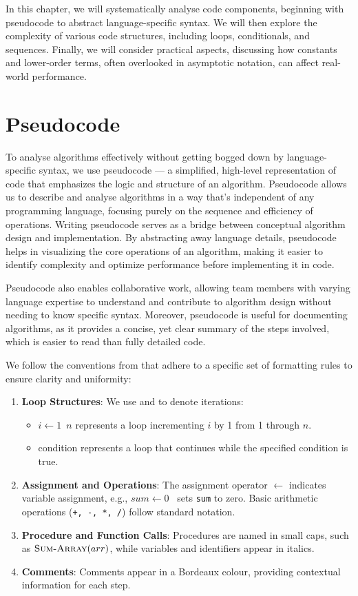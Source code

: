 In this chapter, we will systematically analyse code components, beginning with pseudocode to abstract language-specific syntax. We will then explore the complexity of various code structures, including loops, conditionals, and sequences. Finally, we will consider practical aspects, discussing how constants and lower-order terms, often overlooked in asymptotic notation, can affect real-world performance.


\section{Pseudocode}\label{sec:ch11-1}
To analyse algorithms effectively without getting bogged down by language-specific syntax, we use pseudocode — a simplified, high-level representation of code that emphasizes the logic and structure of an algorithm. Pseudocode allows us to describe and analyse algorithms in a way that’s independent of any programming language, focusing purely on the sequence and efficiency of operations. Writing pseudocode serves as a bridge between conceptual algorithm design and implementation. By abstracting away language details, pseudocode helps in visualizing the core operations of an algorithm, making it easier to identify complexity and optimize performance before implementing it in code.

Pseudocode also enables collaborative work, allowing team members with varying language expertise to understand and contribute to algorithm design without needing to know specific syntax. Moreover, pseudocode is useful for documenting algorithms, as it provides a concise, yet clear summary of the steps involved, which is easier to read than fully detailed code.

We follow the conventions from \cite{clrs4} that adhere to a specific set of formatting rules to ensure clarity and uniformity:

\begin{enumerate}
    \item \textbf{Loop Structures}: We use \texttt{\For} and \texttt{\While} to denote iterations:
    \begin{itemize}
        \item \texttt{\For $i \gets 1$ \To $n$} represents a loop incrementing \( i \) by 1 from 1 through \( n \).
        \item \texttt{\While} condition represents a loop that continues while the specified condition is true.
    \end{itemize}
    \item \textbf{Assignment and Operations}: The assignment operator $\gets$ indicates variable assignment, e.g., \texttt{$sum \gets 0$ } sets \texttt{sum} to zero. Basic arithmetic operations (\texttt{+, -, *, /}) follow standard notation.
    \item \textbf{Procedure and Function Calls}: Procedures are named in small caps, such as \texttt{$\proc{Sum-Array}(arr)$}, while variables and identifiers appear in italics.
    \item \textbf{Comments}: Comments appear in a \textcolor{commentcolor}{Bordeaux} colour, providing contextual information for each step.
\end{enumerate}

